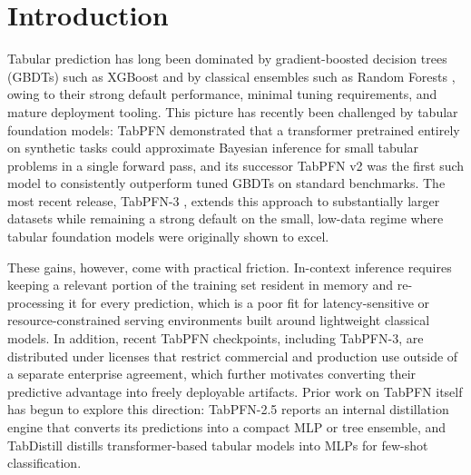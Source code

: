 \documentclass[10pt]{article}
\begin{document}
\vspace{1em}

\section{Introduction}
Tabular prediction has long been dominated by gradient-boosted decision
trees (GBDTs) such as XGBoost \citep{chen2016xgboost} and by classical
ensembles such as Random Forests \citep{breiman2001random}, owing to
their strong default performance, minimal tuning requirements, and
mature deployment tooling. This picture has recently been challenged
by tabular foundation models: TabPFN \citep{hollmann2023tabpfn}
demonstrated that a transformer pretrained entirely on synthetic
tasks could approximate Bayesian inference for small tabular problems
in a single forward pass, and its successor TabPFN v2
\citep{hollmann2025accurate} was the first such model to consistently
outperform tuned GBDTs on standard benchmarks. The most recent
release, TabPFN-3 \citep{priorlabs2026tabpfn3}, extends this approach
to substantially larger datasets while remaining a strong default on
the small, low-data regime where tabular foundation models were
originally shown to excel.

These gains, however, come with practical friction. In-context
inference requires keeping a relevant portion of the training set
resident in memory and re-processing it for every prediction, which
is a poor fit for latency-sensitive or resource-constrained serving
environments built around lightweight classical models. In addition,
recent TabPFN checkpoints, including TabPFN-3, are distributed under
licenses that restrict commercial and production use outside of a
separate enterprise agreement, which further motivates converting
their predictive advantage into freely deployable artifacts. Prior
work on TabPFN itself has begun to explore this direction: TabPFN-2.5
\citep{feuer2025tabpfn25} reports an internal distillation engine that
converts its predictions into a compact MLP or tree ensemble, and
TabDistill \citep{tabdistill2025} distills transformer-based tabular
models into MLPs for few-shot classification.
\end{document}
